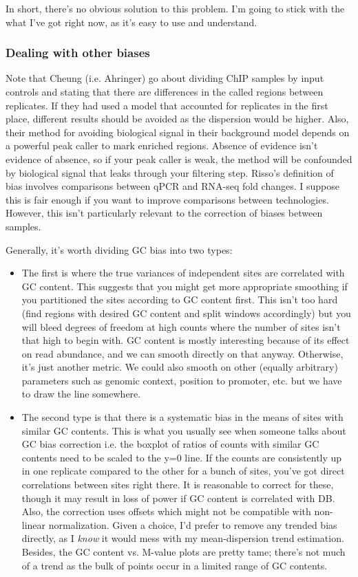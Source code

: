 \documentclass[12pt]{report}
\begin{document}
In short, there's no obvious solution to this problem.
I'm going to stick with the what I've got right now, as it's easy to use and understand. 

\subsubsection*{Dealing with other biases}

Note that Cheung (i.e. Ahringer) go about dividing ChIP samples by input controls and stating that there are differences in the called regions between replicates. 
If they had used a model that accounted for replicates in the first place, different results should be avoided as the dispersion would be higher.  
Also, their method for avoiding biological signal in their background model depends on a powerful peak caller to mark enriched regions. 
Absence of evidence isn't evidence of absence, so if your peak caller is weak, the method will be confounded by biological signal that leaks through your filtering step.  
Risso's definition of bias involves comparisons between qPCR and RNA-seq fold changes. 
I suppose this is fair enough if you want to improve comparisons between technologies. 
However, this isn't particularly relevant to the correction of biases between samples.

Generally, it's worth dividing GC bias into two types:
\begin{itemize}
\item The first is where the true variances of independent sites are correlated with GC content. 
This suggests that you might get more appropriate smoothing if you partitioned the sites according to GC content first. 
This isn't too hard (find regions with desired GC content and split windows accordingly) but you will bleed degrees of freedom at high counts where the number of sites isn't that high to begin with. 
GC content is mostly interesting because of its effect on read abundance, and we can smooth directly on that anyway. 
Otherwise, it's just another metric. 
We could also smooth on other (equally arbitrary) parameters such as genomic context, position to promoter, etc. but we have to draw the line somewhere. 

\item The second type is that there is a systematic bias in the means of sites with similar GC contents.
This is what you usually see when someone talks about GC bias correction i.e. the boxplot of ratios of counts with similar GC contents need to be scaled to the y=0 line. 
If the counts are consistently up in one replicate compared to the other for a bunch of sites, you've got direct correlations between sites right there.
It is reasonable to correct for these, though it may result in loss of power if GC content is correlated with DB.
Also, the correction uses offsets which might not be compatible with non-linear normalization.
Given a choice, I'd prefer to remove any trended bias directly, as I \textit{know} it would mess with my mean-dispersion trend estimation.
Besides, the GC content vs. M-value plots are pretty tame; there's not much of a trend as the bulk of points occur in a limited range of GC contents.
\end{itemize}
\end{document}
